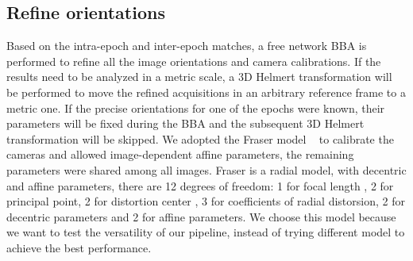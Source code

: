 \subsection{Refine orientations}
Based on the intra-epoch and inter-epoch matches, a free network \ac{BBA} is performed to refine all the image orientations and camera calibrations. If the results need to be analyzed in a metric scale, a 3D Helmert transformation will be performed to move the refined acquisitions in an arbitrary reference frame to a metric one. If the precise orientations for one of the epochs were known, their parameters will be fixed during the \ac{BBA} and the subsequent 3D Helmert transformation will be skipped.
We adopted the Fraser model ~\cite{fraser1997digital} to calibrate the cameras and allowed image-dependent affine parameters, the remaining parameters were shared among all images. 
Fraser is a radial model, with decentric and affine parameters, there are 12 degrees of freedom: 1 for focal length , 2 for principal point, 2 for distortion center , 3 for coefficients of radial distorsion, 2 for decentric parameters and 2 for affine parameters. We choose this model because we want to test the versatility of our pipeline, instead of trying different model to achieve the best performance.

